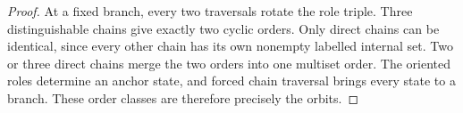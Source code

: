 \begin{proof}
At a fixed branch, every two traversals rotate the role triple. Three
distinguishable chains give exactly two cyclic orders. Only direct chains
can be identical, since every other chain has its own nonempty labelled
internal set. Two or three direct chains merge the two orders into one
multiset order. The oriented roles determine an anchor state, and forced
chain traversal brings every state to a branch. These order classes
are therefore precisely the orbits.
\end{proof}
